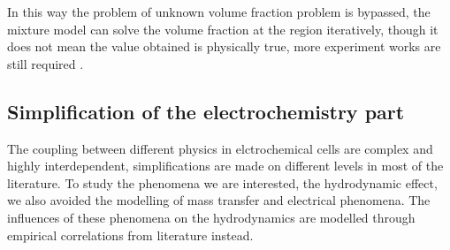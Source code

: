 In this way the problem of unknown volume fraction problem is bypassed, the mixture model can solve the volume fraction at the region iteratively, though it does not mean the value obtained is physically true, more experiment works are still required \cite{Alexiadis2012}.

\subsection{Simplification of the electrochemistry part}





The coupling between different physics in elctrochemical cells are complex and highly interdependent, simplifications are made on different levels \cite{Hreiz2015} in most of the literature. To study the phenomena we are interested, the hydrodynamic effect, we also avoided the modelling of mass transfer and electrical phenomena. The influences of these phenomena on the hydrodynamics are modelled through empirical correlations from literature instead.



